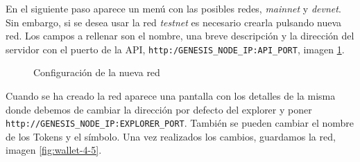 En el siguiente paso aparece un menú con las posibles redes, \textit{mainnet} y \textit{devnet}. Sin embargo, si se desea usar la red \textit{testnet} es necesario crearla pulsando nueva red. Los campos a rellenar son el nombre, una breve descripción y la dirección del servidor con el puerto de la API, \texttt{http:/GENESIS\_NODE\_IP:API\_PORT}, imagen \ref{fig:wallet-3}.

\begin{figure}[H]
	\centering
	\caption{Configuración de la nueva red}
	\label{fig:wallet-3}
\end{figure}

\newpage
Cuando se ha creado la red aparece una pantalla con los detalles de la misma donde debemos de cambiar la dirección por defecto del explorer y poner \texttt{http://GENESIS\_NODE\_IP:EXPLORER\_PORT}. También se pueden cambiar el nombre de los Tokens y el símbolo. Una vez realizados los cambios, guardamos la red, imagen \ref{fig:wallet-4-5}.

